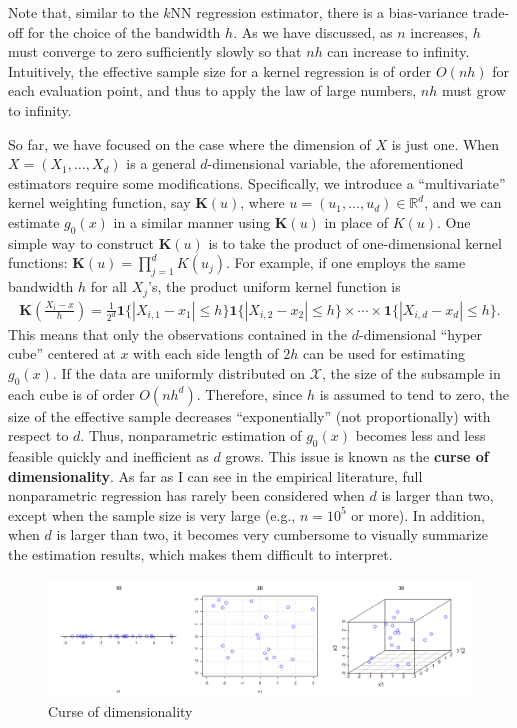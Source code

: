 \documentclass[10.5pt, A4paper, openany, uplatex]{book}
\newcommand{\mbf}{\mathbf}
\newcommand{\mcl}{\mathcal}
\numberwithin{equation}{section}
\begin{document}
Note that, similar to the $k$NN regression estimator, there is a bias-variance trade-off for the choice of the bandwidth $h$.
As we have discussed, as $n$ increases, $h$ must converge to zero sufficiently slowly so that $nh$ can increase to infinity.
Intuitively, the effective sample size for a kernel regression is of order $O(nh)$ for each evaluation point, and thus to apply the law of large numbers, $nh$ must grow to infinity.

\bigskip

So far, we have focused on the case where the dimension of $X$ is just one.
When $X = (X_1, \ldots, X_d)$ is a general $d$-dimensional variable, the aforementioned estimators require some modifications.
Specifically, we introduce a ``multivariate'' kernel weighting function, say $\mbf{K}(u)$, where $u = (u_1, \ldots, u_d) \in \mathbb{R}^d$, and we can estimate $g_0(x)$ in a similar manner using $\mbf{K}(u)$ in place of $K(u)$.
One simple way to construct $\mbf{K}(u)$ is to take the product of one-dimensional kernel functions: $\mbf{K}(u) = \prod_{j=1}^d K(u_j)$.
For example, if one employs the same bandwidth $h$ for all $X_j$'s, the product uniform kernel function is
\begin{align*}
	\mbf{K}\left(\frac{X_i - x}{h}\right) = \frac{1}{2^d}\mbf{1}\{|X_{i,1} - x_1| \le h\}\mbf{1}\{|X_{i,2} - x_2| \le h\} \times \cdots \times \mbf{1}\{|X_{i,d} - x_d| \le h\}.
\end{align*}
This means that only the observations contained in the $d$-dimensional ``hyper cube'' centered at $x$ with each side length of $2h$ can be used for estimating $g_0(x)$.
If the data are uniformly distributed on $\mcl{X}$, the size of the subsample in each cube is of order $O(nh^d)$.
Therefore, since $h$ is assumed to tend to zero, the size of the effective sample decreases ``exponentially'' (not proportionally) with respect to $d$.
Thus, nonparametric estimation of $g_0(x)$ becomes less and less feasible quickly and inefficient as $d$ grows.
This issue is known as the \textbf{curse of dimensionality}.
As far as I can see in the empirical literature, full nonparametric regression has rarely been considered when $d$ is larger than two, except when the sample size is very large (e.g., $n = 10^5$ or more).
In addition, when $d$ is larger than two, it becomes very cumbersome to visually summarize the estimation results, which makes them difficult to interpret.

\begin{figure}[h!]
	\begin{center}
		\includegraphics[width = 18cm]{CoD.png}
		\caption{Curse of dimensionality}
	\end{center}
\end{figure}
\end{document}
